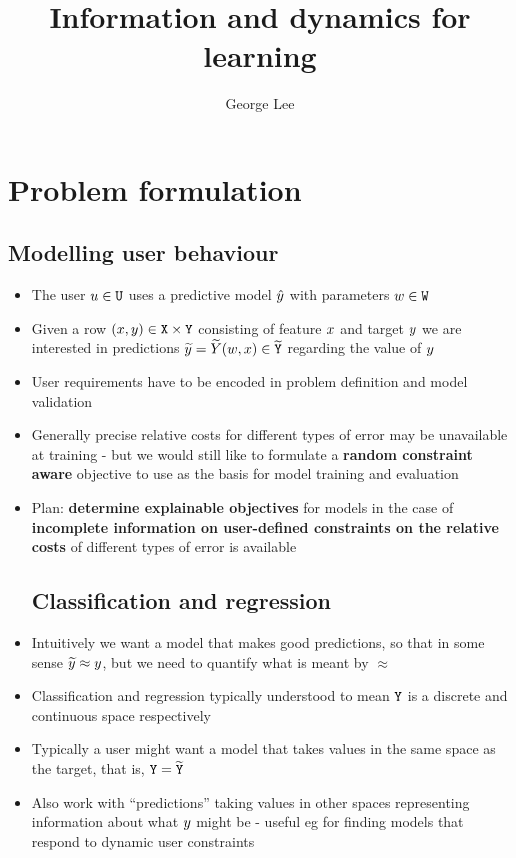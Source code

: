 \documentclass{article}
\title{Information and dynamics for learning}
\author{George Lee}
\begin{document}
\maketitle
\section{Problem formulation}

\subsection{Modelling user behaviour}
\begin{itemize}
  \item
    The user $\Usr\in\MEM$ uses a predictive model $\PRED$ with parameters $\Par\in\PARS$
  \item
    Given a row $(\Feat,\Targ)\in\IN\times\OUT$ consisting of feature $\Feat$ and target ${y}$ we are interested in predictions $\Predsmooth=\PREDSMOOTH(\Par,\Feat)\in\OUTPR$ regarding the value of ${y}$
  \item
    User requirements have to be encoded in problem definition and model validation
  \item
    Generally precise relative costs for different types of error may be unavailable at training - but we would still like to formulate a \textbf{random constraint aware} objective to use as the basis for model training and evaluation
  \item
    Plan: \textbf{determine explainable objectives} for models in the case of \textbf{incomplete information on user-defined constraints on the relative costs} of different types of error is available
    \subsection{Classification and regression}
  \item
    Intuitively we want a model that makes good predictions, so that in some sense $\Predsmooth\approx\Targ$, but we need to quantify what is meant by $\approx$
  \item
    Classification and regression typically understood to mean $\OUT$ is a discrete and continuous space respectively
  \item
    Typically a user might want a model that takes values in the same space as the target, that is, $\OUT=\OUTPR$
  \item
    Also work with ``predictions'' taking values in other spaces representing information about what $\Targ$ might be - useful eg for finding models that respond to dynamic user constraints

\end{itemize}
\end{document}
